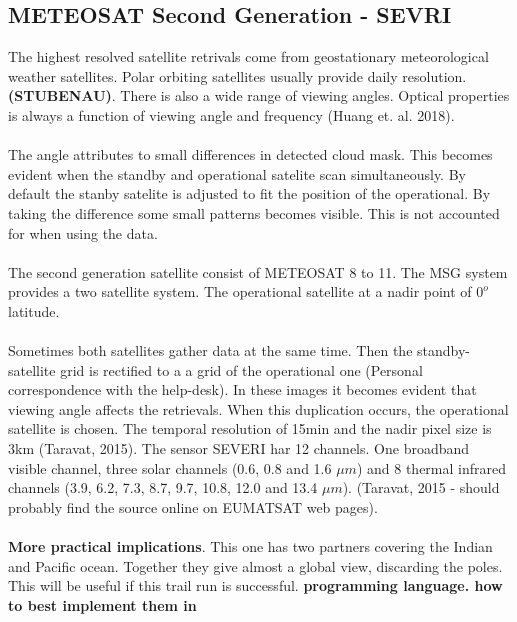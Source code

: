 \subsection{METEOSAT Second Generation - SEVRI} \label{sec:meteosat}
The highest resolved satellite retrivals come from geostationary meteorological weather satellites. Polar orbiting satellites usually provide daily resolution.\textbf{ (STUBENAU)}. There is also a wide range of viewing angles. Optical properties is always a function of viewing angle and frequency (Huang et. al. 2018).  
\\ \\
The angle attributes to small differences in detected cloud mask. This becomes evident when the standby and operational satelite scan simultaneously. By default the stanby satelite is adjusted to fit the position of the operational. By taking the difference some small patterns becomes visible. This is not accounted for when using the data. 
\\ \\ 
The second generation satellite consist of METEOSAT 8 to 11. The MSG system provides a two satellite system. The operational satellite at a nadir point of $0^o$ latitude. 
\\ \\ 
Sometimes both satellites gather data at the same time. Then the standby-satellite grid is rectified to a a grid of the operational one (Personal correspondence with the help-desk). In these images it becomes evident that viewing angle affects the retrievals. When this duplication occurs, the operational satellite is chosen. The temporal resolution of 15min and the nadir pixel size is 3km (Taravat, 2015). The sensor SEVERI har 12 channels. One broadband visible channel, three solar channels (0.6, 0.8 and 1.6 $\mu m$) and 8 thermal infrared channels (3.9, 6.2, 7.3, 8.7, 9.7, 10.8, 12.0 and 13.4 $\mu m$). (Taravat, 2015 - should probably find the source online on EUMATSAT web pages).
\\ \\ 
\textbf{More practical implications}. This one has two partners covering the Indian and Pacific ocean. Together they give almost a global view, discarding the poles. This will be useful if this trail run is successful.  \textbf{programming language. how to best implement them in }

